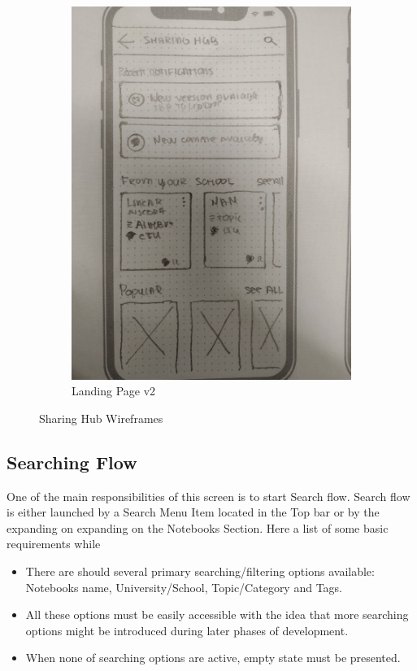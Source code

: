 \documentclass[thesis=B,english]{FITthesis}[2012/10/20]
\begin{document}
\begin{figure}[H]
\begin{subfigure}{.5\textwidth}
\end{subfigure}%
\begin{subfigure}{.5\textwidth}
  \centering
  \includegraphics[scale=0.2]{sharingHubV2.jpg}
  \caption{Landing Page v2}
  \label{fig:section-sharinghubv2sletch}
\end{subfigure}

\caption{Sharing Hub Wireframes}
\label{fig:publishing-wireframe}
\end{figure}


\newpage
\subsection{Searching Flow}
 One of the main responsibilities of this screen is to start Search flow. Search flow is either launched by a Search Menu Item located in the Top bar or by the expanding on expanding on the Notebooks Section. Here a list of some basic requirements while
 \begin{itemize}
 
 \item There are should several primary searching/filtering options available: Notebooks name, University/School, Topic/Category and Tags.
 \item All these options must be easily accessible with the idea that more searching options might be introduced during later phases of development.
 \item When none of searching options are active, empty state must be presented.
  \end{itemize}
\end{document}

